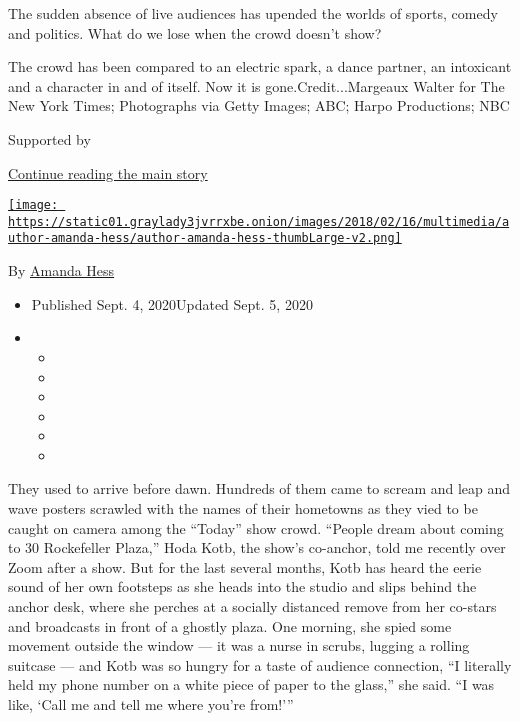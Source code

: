 The sudden absence of live audiences has upended the worlds of sports,
comedy and politics. What do we lose when the crowd doesn't show?

The crowd has been compared to an electric spark, a dance partner, an
intoxicant and a character in and of itself. Now it is
gone.Credit...Margeaux Walter for The New York Times; Photographs via
Getty Images; ABC; Harpo Productions; NBC

Supported by

\protect\hyperlink{after-sponsor}{Continue reading the main story}

\href{https://www.nytimes3xbfgragh.onion/by/amanda-hess}{\texttt{[image: https://static01.graylady3jvrrxbe.onion/images/2018/02/16/multimedia/author-amanda-hess/author-amanda-hess-thumbLarge-v2.png]}}

By \href{https://www.nytimes3xbfgragh.onion/by/amanda-hess}{Amanda Hess}

\begin{itemize}
\item
  Published Sept. 4, 2020Updated Sept. 5, 2020
\item
  \begin{itemize}
  \item
  \item
  \item
  \item
  \item
  \item
  \end{itemize}
\end{itemize}

They used to arrive before dawn. Hundreds of them came to scream and
leap and wave posters scrawled with the names of their hometowns as they
vied to be caught on camera among the ``Today'' show crowd. ``People
dream about coming to 30 Rockefeller Plaza,'' Hoda Kotb, the show's
co-anchor, told me recently over Zoom after a show. But for the last
several months, Kotb has heard the eerie sound of her own footsteps as
she heads into the studio and slips behind the anchor desk, where she
perches at a socially distanced remove from her co-stars and broadcasts
in front of a ghostly plaza. One morning, she spied some movement
outside the window --- it was a nurse in scrubs, lugging a rolling
suitcase --- and Kotb was so hungry for a taste of audience connection,
``I literally held my phone number on a white piece of paper to the
glass,'' she said. ``I was like, `Call me and tell me where you're
from!'''

